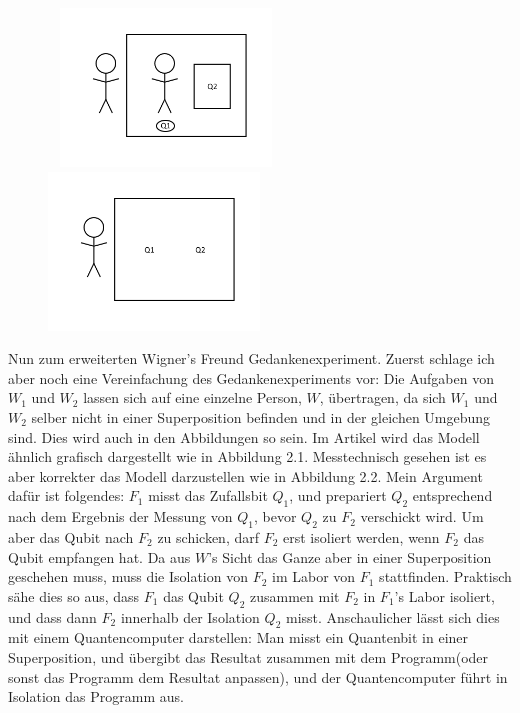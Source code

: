 \documentclass[a4paper]{article}
\begin{document}
\begin{figure}[!htb]
\begin{floatrow}[2]\
%
{\includegraphics[width=0.5\textwidth]{a.png}}
%
%
{\includegraphics[width=0.5\textwidth]{b.png}}
\end{floatrow}
\end{figure}
Nun zum erweiterten Wigner's Freund Gedankenexperiment. Zuerst schlage ich aber noch eine Vereinfachung des Gedankenexperiments vor: Die Aufgaben von $W_1$ und $W_2$ lassen sich auf eine einzelne Person, $W$, übertragen, da sich $W_1$ und $W_2$ selber nicht in einer Superposition befinden und in der gleichen Umgebung sind. Dies wird auch in den Abbildungen so sein. Im Artikel wird das Modell ähnlich grafisch dargestellt wie in Abbildung 2.1. Messtechnisch gesehen ist es aber korrekter das Modell darzustellen wie in Abbildung 2.2. Mein Argument dafür ist folgendes: $F_1$ misst das Zufallsbit $Q_1$, und prepariert $Q_2$ entsprechend nach dem Ergebnis der Messung von $Q_1$, bevor $Q_2$ zu $F_2$ verschickt wird. Um aber das Qubit nach $F_2$ zu schicken, darf $F_2$ erst isoliert werden, wenn $F_2$ das Qubit empfangen hat. Da aus $W$'s Sicht das Ganze aber in einer Superposition geschehen muss, muss die Isolation von $F_2$ im Labor von $F_1$ stattfinden. Praktisch sähe dies so aus, dass $F_1$ das Qubit $Q_2$ zusammen mit $F_2$ in $F_1$'s Labor isoliert, und dass dann $F_2$ innerhalb der Isolation $Q_2$ misst. Anschaulicher lässt sich dies mit einem Quantencomputer darstellen: Man misst ein Quantenbit in einer Superposition, und übergibt das Resultat zusammen mit dem Programm(oder sonst das Programm dem Resultat anpassen), und der Quantencomputer führt in Isolation das Programm aus.
\end{document}
